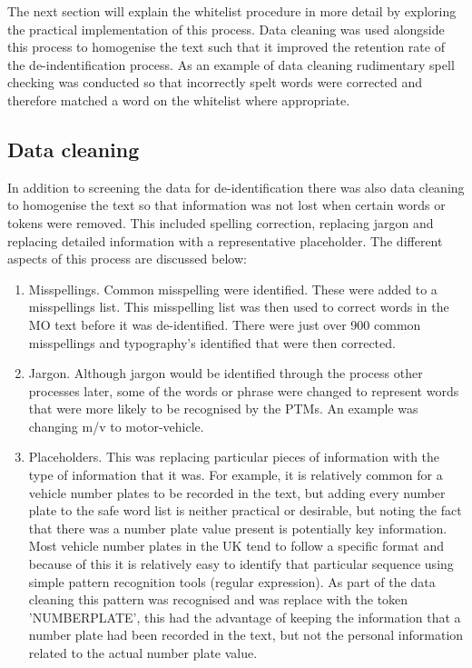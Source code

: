 The next section will explain the whitelist procedure in more detail by exploring the practical implementation of this process. Data cleaning was used alongside this process to homogenise the text such that it improved the retention rate of the de-indentification process. As an example of data cleaning rudimentary spell checking was conducted so that incorrectly spelt words were corrected and therefore matched a word on the whitelist where appropriate. 


\subsection{Data cleaning} In addition to screening the data for de-identification there was also data cleaning to homogenise the text so that information was not lost when certain words or tokens were removed. This included spelling correction, replacing jargon and replacing detailed information with a representative placeholder. The different aspects of this process are discussed below:

\begin{enumerate}
    \item{Misspellings.} Common misspelling were identified. These were added to a misspellings list. This misspelling list was then used to correct words in the MO text before it was de-identified. There were just over 900 common misspellings and typography's identified that were then corrected.
    
    \item{Jargon.} Although jargon would be identified through the process other processes later, some of the words or phrase were changed to represent words that were more likely to be recognised by the PTMs. An example was changing m/v to motor-vehicle. 
    
    \item{Placeholders.} This was replacing particular pieces of information with the type of information that it was. For example, it is relatively common for a vehicle number plates to be recorded in the text, but adding every number plate to the safe word list is neither practical or desirable, but noting the fact that there was a number plate value present is potentially key information. Most vehicle number plates in the UK tend to follow a specific format and because of this it is relatively easy to identify that particular sequence using simple pattern recognition tools (regular expression). As part of the data cleaning this pattern was recognised and was replace with the token 'NUMBERPLATE', this had the advantage of keeping the information that a number plate had been recorded in the text, but not the personal information related to the actual number plate value.
\end{enumerate}


